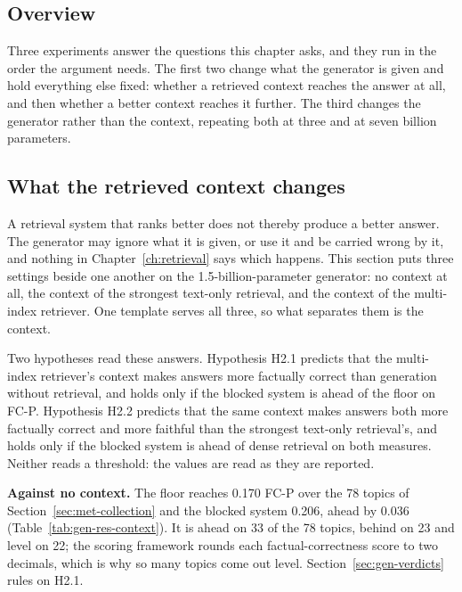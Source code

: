\subsection{Overview}\label{sec:gen-res-intro}

Three experiments answer the questions this chapter asks, and they run in the order the
argument needs. The first two change what the generator is given and hold everything else
fixed: whether a retrieved context reaches the answer at all, and then whether a better
context reaches it further. The third changes the generator rather than the context,
repeating both at three and at seven billion parameters.

\subsection{What the retrieved context changes}\label{sec:gen-res-context}

A retrieval system that ranks better does not thereby produce a better answer. The generator
may ignore what it is given, or use it and be carried wrong by it, and nothing in
Chapter~\ref{ch:retrieval} says which happens. This section puts three settings beside one
another on the 1.5-billion-parameter generator: no context at all, the context of the
strongest text-only retrieval, and the context of the multi-index retriever. One template
serves all three, so what separates them is the context.

Two hypotheses read these answers. Hypothesis H2.1 predicts that the multi-index retriever's
context makes answers more factually correct than generation without retrieval, and holds only
if the blocked system is ahead of the floor on FC-P. Hypothesis H2.2 predicts that the same
context makes answers both more factually correct and more faithful than the strongest
text-only retrieval's, and holds only if the blocked system is ahead of dense retrieval on
both measures. Neither reads a threshold: the values are read as they are reported.

\textbf{Against no context.} The floor reaches 0.170 FC-P over the 78 topics of
Section~\ref{sec:met-collection} and the blocked system 0.206, ahead by 0.036
(Table~\ref{tab:gen-res-context}). It is ahead on 33 of the 78 topics, behind on 23 and level
on 22; the scoring framework rounds each factual-correctness score to two decimals, which is
why so many topics come out level. Section~\ref{sec:gen-verdicts} rules on H2.1.

